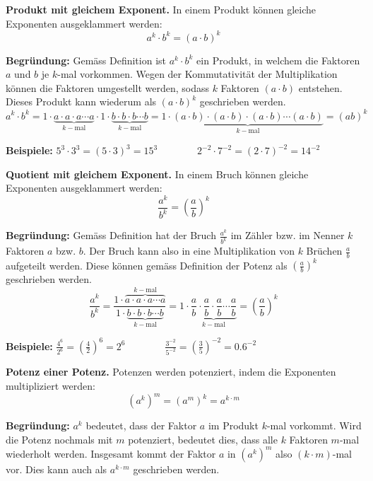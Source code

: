 \begin{theorem}
  \textbf{Produkt mit gleichem Exponent.} In einem Produkt können gleiche Exponenten ausgeklammert werden:
  \[
    a^{k}\cdot b^{k} = (a\cdot b)^{k}
  \]
\end{theorem}
\textbf{Begründung:} Gemäss Definition ist $a^{k}\cdot b^{k}$ ein Produkt, in welchem die Faktoren $a$ und $b$ je $k$-mal vorkommen. Wegen der Kommutativität der Multiplikation können die Faktoren umgestellt werden, sodass $k$ Faktoren $(a\cdot b)$ entstehen. Dieses Produkt kann wiederum als $(a\cdot b)^{k}$ geschrieben werden.
\[
  a^{k}\cdot b^{k} = 1\cdot\underbrace{a\cdot a\cdot a\cdots a}_{k-\text{mal}}\cdot 1\cdot\underbrace{b\cdot b\cdot b\cdots b}_{k-\text{mal}} = 1\cdot\underbrace{(a\cdot b)\cdot (a\cdot b)\cdot (a\cdot b)\cdots (a\cdot b)}_{k-\text{mal}} = (ab)^{k}
\]
\begin{example}
  \textbf{Beispiele:} $\displaystyle 5^{3} \cdot 3^{3} = (5\cdot 3)^{3} = 15^{3} \qquad\qquad 2^{-2}\cdot 7^{-2} = (2\cdot 7)^{-2} = 14^{-2}$
\end{example}
\begin{theorem}
  \textbf{Quotient mit gleichem Exponent.} In einem Bruch können gleiche Exponenten ausgeklammert werden:
  \[
    \frac{a^{k}}{b^{k}} = \left(\frac{a}{b}\right)^{k}
  \]
\end{theorem}
\textbf{Begründung:} Gemäss Definition hat der Bruch $\frac{a^{k}}{b^{k}}$ im Zähler bzw. im Nenner $k$ Faktoren $a$ bzw. $b$. Der Bruch kann also in eine Multiplikation von $k$ Brüchen $\frac{a}{b}$ aufgeteilt werden. Diese können gemäss Definition der Potenz als $\left(\frac{a}{b}\right)^{k}$ geschrieben werden.
\[
  \frac{a^{k}}{b^{k}} = \frac{1\cdot\overbrace{a\cdot a\cdot a\cdots a}^{k-\text{mal}}}{1\cdot\underbrace{b\cdot b\cdot b\cdots b}_{k-\text{mal}}} = 1\cdot\underbrace{\frac{a}{b}\cdot \frac{a}{b}\cdot \frac{a}{b}\cdots \frac{a}{b}}_{k-\text{mal}} = \left(\frac{a}{b}\right)^{k}
\]
\begin{example}
  \textbf{Beispiele:} $\displaystyle \frac{4^{6}}{2^{6}} = \left(\frac{4}{2}\right)^{6} = 2^{6} \qquad\qquad \frac{3^{-2}}{5^{-2}} = \left(\frac{3}{5}\right)^{-2} = 0.6^{-2}$
\end{example}
\begin{theorem}
  \textbf{Potenz einer Potenz.} Potenzen werden potenziert, indem die Exponenten multipliziert werden:
  \[
    \left(a^{k}\right)^{m} = \left(a^{m}\right)^{k}= a^{k\cdot m}
  \]
\end{theorem}
\textbf{Begründung:} $a^{k}$ bedeutet, dass der Faktor $a$ im Produkt $k$-mal vorkommt. Wird die Potenz nochmals mit $m$ potenziert, bedeutet dies, dass alle $k$ Faktoren $m$-mal wiederholt werden. Insgesamt kommt der Faktor $a$ in $\left(a^{k}\right)^{m}$ also $(k\cdot m)$-mal vor. Dies kann auch als $a^{k\cdot m}$ geschrieben werden.
